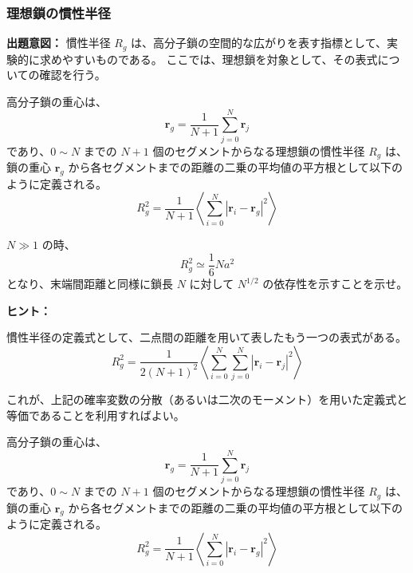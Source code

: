 \documentclass[uplatex,dvipdfmx,a4paper,11pt]{jsarticle}
\begin{document}
\newpage

\color{black}

\subsubsection{理想鎖の慣性半径}

\begin{boxnote}
{\bf 出題意図：} 慣性半径 $R_g$ は、高分子鎖の空間的な広がりを表す指標として、実験的に求めやすいものである。
ここでは、理想鎖を対象として、その表式についての確認を行う。
\end{boxnote}

\vspace{10pt}

高分子鎖の重心は、
\begin{equation*}
\bm{r}_g = \dfrac{1}{N+1} \sum_{j=0}^{N} \bm{r}_j
\end{equation*}
であり、$0 \sim N$ までの $N+1$ 個のセグメントからなる理想鎖の慣性半径 $R_g$ は、鎖の重心 $\bm{r}_g$ から各セグメントまでの距離の二乗の平均値の平方根として以下のように定義される。
\begin{equation*}
R_g^2 = \dfrac{1}{N+1} \left\langle \sum_{i=0}^{N} |\bm{r}_i - \bm{r}_g|^2 \right\rangle
\end{equation*}

$N \gg 1$ の時、
\begin{equation*}
R_g^2 \simeq \dfrac{1}{6}N a^2
\end{equation*}
となり、末端間距離と同様に鎖長 $N$ に対して $N^{1/2}$ の依存性を示すことを示せ。

\vspace{10pt}

\begin{itembox}[l]{{\bf ヒント：}}

慣性半径の定義式として、二点間の距離を用いて表したもう一つの表式がある。
\begin{equation*}
R_g^2 = \dfrac{1}{2(N+1)^2} \left \langle \sum_{i=0}^N \sum_{j=0}^N \left| \bm{r}_i - \bm{r}_j \right|^2 \right \rangle
\end{equation*}

これが、上記の確率変数の分散（あるいは二次のモーメント）を用いた定義式と等価であることを利用すればよい。
\end{itembox}

\newpage
高分子鎖の重心は、
\begin{equation*}
\bm{r}_g = \dfrac{1}{N+1} \sum_{j=0}^{N} \bm{r}_j
\end{equation*}
であり、$0 \sim N$ までの $N+1$ 個のセグメントからなる理想鎖の慣性半径 $R_g$ は、鎖の重心 $\bm{r}_g$ から各セグメントまでの距離の二乗の平均値の平方根として以下のように定義される。
\begin{equation*}
R_g^2 = \dfrac{1}{N+1} \left\langle \sum_{i=0}^{N} |\bm{r}_i - \bm{r}_g|^2 \right\rangle
\end{equation*}
\end{document}
